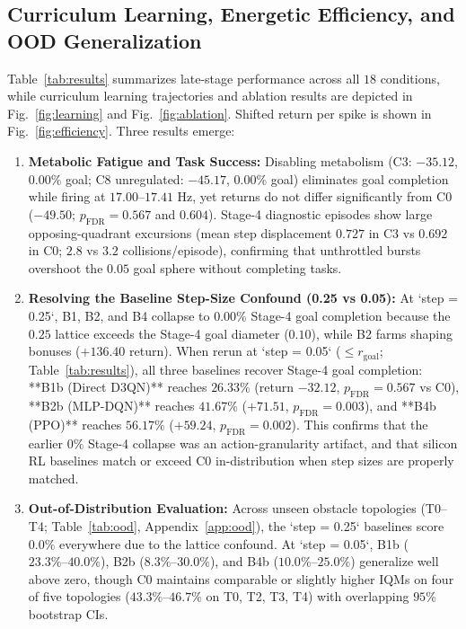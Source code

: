 \documentclass[journal]{IEEEtran}
\begin{document}
\subsection{Curriculum Learning, Energetic Efficiency, and OOD Generalization}
Table~\ref{tab:results} summarizes late-stage performance across all $18$ conditions, while curriculum learning trajectories and ablation results are depicted in Fig.~\ref{fig:learning} and Fig.~\ref{fig:ablation}. Shifted return per spike is shown in Fig.~\ref{fig:efficiency}. Three results emerge:
\begin{enumerate}
    \item \textbf{Metabolic Fatigue and Task Success:} Disabling metabolism (C3: $-35.12$, $0.00\%$ goal; C8 unregulated: $-45.17$, $0.00\%$ goal) eliminates goal completion while firing at $17.00\text{--}17.41\text{ Hz}$, yet returns do not differ significantly from C0 ($-49.50$; $p_{\mathrm{FDR}} = 0.567$ and $0.604$). Stage-4 diagnostic episodes show large opposing-quadrant excursions (mean step displacement $0.727$ in C3 vs $0.692$ in C0; $2.8$ vs $3.2$ collisions/episode), confirming that unthrottled bursts overshoot the $0.05$ goal sphere without completing tasks.
    \item \textbf{Resolving the Baseline Step-Size Confound (0.25 vs 0.05):} At `step = 0.25`, B1, B2, and B4 collapse to $0.00\%$ Stage-4 goal completion because the $0.25$ lattice exceeds the Stage-4 goal diameter ($0.10$), while B2 farms shaping bonuses ($+136.40$ return). When rerun at `step = 0.05` ($\le r_{\mathrm{goal}}$; Table~\ref{tab:results}), all three baselines recover Stage-4 goal completion: **B1b (Direct D3QN)** reaches $26.33\%$ (return $-32.12$, $p_{\mathrm{FDR}} = 0.567$ vs C0), **B2b (MLP-DQN)** reaches $41.67\%$ ($+71.51$, $p_{\mathrm{FDR}} = 0.003$), and **B4b (PPO)** reaches $56.17\%$ ($+59.24$, $p_{\mathrm{FDR}} = 0.002$). This confirms that the earlier $0\%$ Stage-4 collapse was an action-granularity artifact, and that silicon RL baselines match or exceed C0 in-distribution when step sizes are properly matched.
    \item \textbf{Out-of-Distribution Evaluation:} Across unseen obstacle topologies (T0--T4; Table~\ref{tab:ood}, Appendix~\ref{app:ood}), the `step = 0.25` baselines score $0.0\%$ everywhere due to the lattice confound. At `step = 0.05`, B1b ($23.3\%\text{--}40.0\%$), B2b ($8.3\%\text{--}30.0\%$), and B4b ($10.0\%\text{--}25.0\%$) generalize well above zero, though C0 maintains comparable or slightly higher IQMs on four of five topologies ($43.3\%\text{--}46.7\%$ on T0, T2, T3, T4) with overlapping $95\%$ bootstrap CIs.
\end{enumerate}
\end{document}
